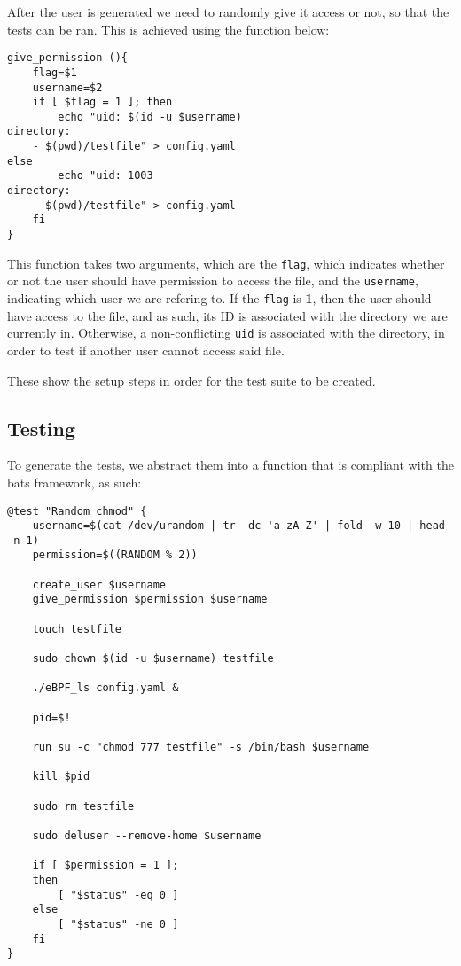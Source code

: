 After the user is generated we need to randomly give it access or not, so that the tests can be ran.
This is achieved using the function below:

\begin{lstlisting}
give_permission (){
    flag=$1
    username=$2
    if [ $flag = 1 ]; then
        echo "uid: $(id -u $username)
directory:
    - $(pwd)/testfile" > config.yaml
else
        echo "uid: 1003 
directory:
    - $(pwd)/testfile" > config.yaml
    fi
}
\end{lstlisting}

This function takes two arguments, which are the \texttt{flag}, which indicates whether or not the user should have permission to access the file, and the \texttt{username}, indicating which user we are refering to.
If the \texttt{flag} is \textbf{1}, then the user should have access to the file, and as such, its ID is associated with the directory we are currently in. Otherwise, a non-conflicting \texttt{uid} is associated with the directory, in order to test if another user cannot access said file.

These show the setup steps in order for the test suite to be created.


\subsection{Testing}

To generate the tests, we abstract them into a function that is compliant with the bats framework, as such:

\begin{lstlisting}
@test "Random chmod" {
    username=$(cat /dev/urandom | tr -dc 'a-zA-Z' | fold -w 10 | head -n 1)
    permission=$((RANDOM % 2))

    create_user $username
    give_permission $permission $username

    touch testfile

    sudo chown $(id -u $username) testfile

    ./eBPF_ls config.yaml &

    pid=$!

    run su -c "chmod 777 testfile" -s /bin/bash $username

    kill $pid

    sudo rm testfile

    sudo deluser --remove-home $username

    if [ $permission = 1 ];
    then
        [ "$status" -eq 0 ]
    else
        [ "$status" -ne 0 ]
    fi
}
\end{lstlisting}

